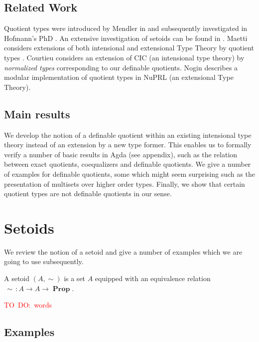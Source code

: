 \documentclass[envcountsame]{llncs}
\newcommand{\todo}[1]{\textcolor{red}{TO~DO:~#1}}
\DeclareMathOperator{\Prop}{\mathbf{Prop}}
\begin{document}

\subsection{Related Work}
\label{sec:related-work}

Quotient types were introduced by Mendler in
\cite{mendler1990quotient} and subsequently investigated in Hofmann's
PhD \cite{hofmann1995thesis}. An extensive investigation of setoids
can be found in \cite{barthe2003setoids}. Maetti considers extensions of both
intensional and extensional Type Theory by quotient types
\cite{maietti1999effective}. Courtieu considers an extension of CIC (an intensional
type theory) by \emph{normalized types} corresponding to our definable
quotients. Nogin describes a modular implementation of quotient types
in NuPRL (an extensional Type Theory).

\subsection{Main results}
\label{sec:main-results}

We develop the notion of a definable quotient within an existing
intensional type theory instead of an extension by a new type former.
This enables us to formally verify a number of basic results in Agda
(see appendix), such as the relation between exact quotients,
coequalizers and definable quotients. We give a number of examples for
definable quotients, some which might seem surprising such as the presentation
of multisets over higher order types. Finally, we show that certain
quotient types are not definable quotients in our sense.

\section{Setoids}\label{sec:setoids}

We review the notion of a setoid and give a number of examples which
we are going to use subsequently.

\begin{definition}
A setoid $(A,\sim)$ is a set $A$ equipped with an equivalence relation ${\,\sim\,}\colon A \to A \to \Prop$.
\end{definition}
\todo{words}
\subsection{Examples}\label{sec:setoids:examples}
\end{document}
